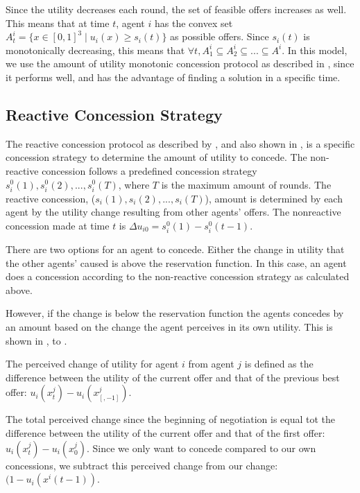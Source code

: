 Since the utility decreases each round, the set of feasible offers increases as well. This means that at time $t$, agent $i$ has the convex set $A^i_t = \{x\in [0,1]^3 \mid u_i(x) \geq s_i(t)   \}$ as possible offers. Since $s_i(t)$ is monotonically decreasing, this means that $\forall t, A^i_1\subseteq A^i_2 \subseteq ... \subseteq A^i$. In this model, we use the amount of utility monotonic concession protocol as described in , since it performs well, and has the advantage of finding a solution in a specific time.

\subsection{Reactive Concession Strategy}
\label{sec:reactiveconcessionstr}
The reactive concession protocol as described by \citet{zheng2015automated}, and also shown in , is a specific concession strategy to determine the amount of utility to concede. The non-reactive concession follows a predefined concession strategy $s_i^0(1), s_i^0(2),...,s_i^0(T)$, where $T$ is the maximum amount of rounds. The reactive concession, ($s_i(1), s_i(2),..., s_i(T)$), amount is determined by each agent by the utility change resulting from other agents' offers. The nonreactive concession made at time $t$ is $\Delta u_{i0} = s^0_i(1)-s^0_i(t-1)$.

There are two options for an agent to concede. Either the change in utility that the other agents' caused is above the reservation function. In this case, an agent does a concession according to the non-reactive concession strategy as calculated above. 


 However, if the change is below the reservation function the agents concedes by an amount based on the change the agent perceives in its own utility. This is shown in ,   to .  
 
 The perceived change of utility for agent $i$ from agent $j$ is defined as the difference between the utility of the current offer and that of the previous best offer: $u_i(x^j_t)-u_i(x^j_{[,-1]})$.
 
 The total perceived change since the beginning of negotiation is equal tot the difference between the utility of the current offer and that of the first offer: $u_i(x^j_t)-u_i(x^j_0)$. Since we only want to concede compared to our own concessions, we subtract this perceived change from our change: $(1-u_i(x^i(t-1))$.
 

